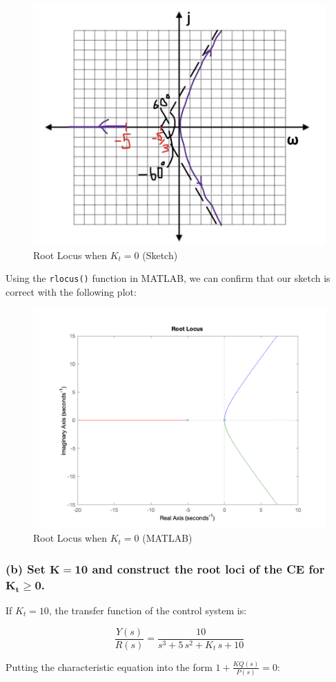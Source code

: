 \documentclass[12pt, letterpaper]{../assignment}
\begin{document}
\begin{figure}[H]
    \centering
    \includegraphics[width=0.5\linewidth]{./figures/Q2_sketch_1.png}
    \caption{Root Locus when $K_t = 0$ (Sketch)}
    \label{fig:step}
\end{figure}

Using the \texttt{rlocus()} function in MATLAB, we can confirm that our sketch is correct with the following plot:

\begin{figure}[H]
    \centering
    \includegraphics[width=0.7\linewidth]{./figures/Q2a_MATLAB_rootLocus.png}
    \caption{Root Locus when $K_t = 0$ (MATLAB)}
    \label{fig:step}
\end{figure}

\subsubsection*{(b) Set $\mathbf{K=10}$ and construct the root loci of the CE for $\mathbf{K_t \ge 0}$.}

If $K_t = 10$, the transfer function of the control system is:

$$ \frac{Y(s)}{R(s)} = \frac{10}{s^3+5\,s^2+K_{t}\,s+10} $$

Putting the characteristic equation into the form $ 1 + \frac{K Q(s)}{P(s)} = 0 $:
\end{document}
